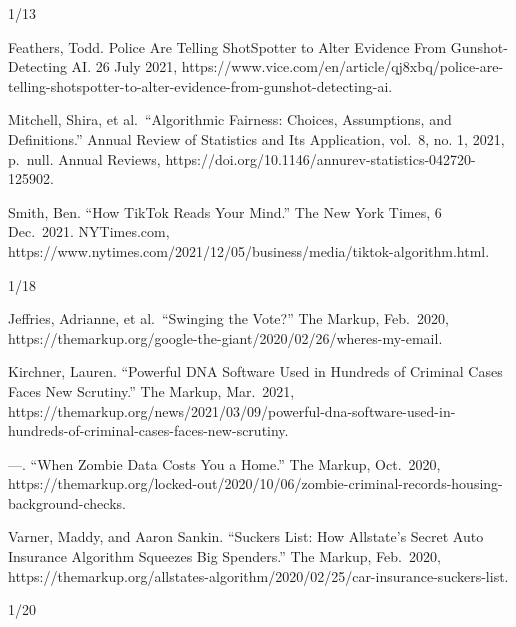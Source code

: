 \documentclass[
]{article}
\newlength{\cslhangindent}
\newlength{\cslentryspacingunit} %
\newenvironment{CSLReferences}[2] %
 {%
  \setlength{\parindent}{0pt}
  \ifodd #1
  \let\oldpar\par
  \def\par{\hangindent=\cslhangindent\oldpar}
  \fi
  \setlength{\parskip}{#2\cslentryspacingunit}
 }%
 {}
\begin{document}
1/13

\begin{CSLReferences}{0}{0}
Feathers, Todd. Police Are Telling ShotSpotter to Alter Evidence From
Gunshot-Detecting AI. 26 July 2021,
https://www.vice.com/en/article/qj8xbq/police-are-telling-shotspotter-to-alter-evidence-from-gunshot-detecting-ai.

{}

Mitchell, Shira, et al.~``Algorithmic Fairness: Choices, Assumptions,
and Definitions.'' Annual Review of Statistics and Its Application,
vol.~8, no. 1, 2021, p.~null. Annual Reviews,
https://doi.org/10.1146/annurev-statistics-042720-125902.

{}

Smith, Ben. ``How TikTok Reads Your Mind.'' The New York Times, 6
Dec.~2021. NYTimes.com,
https://www.nytimes.com/2021/12/05/business/media/tiktok-algorithm.html.

{}

\end{CSLReferences}

1/18

\begin{CSLReferences}{0}{0}
Jeffries, Adrianne, et al.~``Swinging the Vote?'' The Markup, Feb.~2020,
https://themarkup.org/google-the-giant/2020/02/26/wheres-my-email.

{}

Kirchner, Lauren. ``Powerful DNA Software Used in Hundreds of Criminal
Cases Faces New Scrutiny.'' The Markup, Mar.~2021,
https://themarkup.org/news/2021/03/09/powerful-dna-software-used-in-hundreds-of-criminal-cases-faces-new-scrutiny.

{}

---. ``When Zombie Data Costs You a Home.'' The Markup, Oct.~2020,
https://themarkup.org/locked-out/2020/10/06/zombie-criminal-records-housing-background-checks.

{}

Varner, Maddy, and Aaron Sankin. ``Suckers List: How Allstate's Secret
Auto Insurance Algorithm Squeezes Big Spenders.'' The Markup, Feb.~2020,
https://themarkup.org/allstates-algorithm/2020/02/25/car-insurance-suckers-list.

{}

\end{CSLReferences}

1/20
\end{document}
